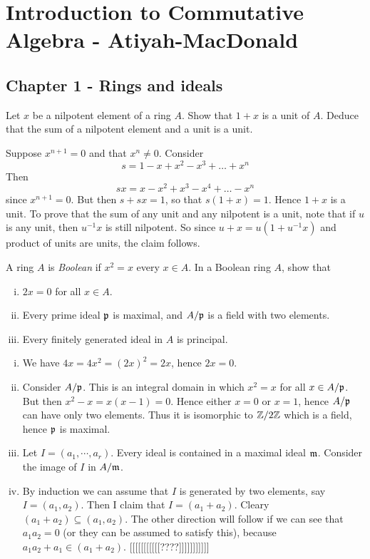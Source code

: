 \documentclass[11pt, english]{article}
\begin{document}
\section{Introduction to Commutative Algebra - Atiyah-MacDonald}

\subsection{Chapter 1 - Rings and ideals}

\begin{exc}
Let $x$ be a nilpotent element of a ring $A$. Show that $1+x$ is a unit of $A$. Deduce that the sum of a nilpotent element and a unit is a unit.
\end{exc}
\begin{sol}
Suppose $x^{n+1}=0$ and that $x^n \neq 0$. Consider
\[
s = 1-x+x^2-x^3+\ldots+x^n
\]
Then
\[
sx = x-x^2+x^3-x^4+\ldots-x^n
\]
since $x^{n+1}=0$. But then $s+sx=1$, so that $s(1+x)=1$. Hence $1+x$ is a unit. To prove that the sum of any unit and any nilpotent is a unit, note that if $u$ is any unit, then $u^{-1}x$ is still nilpotent. So since $u+x=u(1+u^{-1}x)$ and product of units are units, the claim follows.
\end{sol}

\begin{exc}[Exercise 11]
A ring $A$ is \emph{Boolean} if $x^2=x$ every $x \in A$. In a Boolean ring $A$, show that
\begin{enumerate}[i)]
\item $2x=0$ for all $x \in A$.
\item Every prime ideal $\mathfrak{p}$ is maximal, and $A/\mathfrak{p}$ is a field with two elements.
\item Every finitely generated ideal in $A$ is principal.
\end{enumerate}
\end{exc}
\begin{sol}
  \begin{enumerate}[i)]
  \item We have $4x=4x^2=(2x)^2=2x$, hence $2x=0$.
\item Consider $A/\mathfrak{p}$. This is an integral domain in which $x^2=x$ for all $x \in A/\mathfrak{p}$. But then $x^2-x=x(x-1)=0$. Hence either $x=0$ or $x=1$, hence $A/\mathfrak{p}$ can have only two elements. Thus it is isomorphic to $\mathbb{Z}/2\mathbb{Z}$ which is a field, hence $\mathfrak{p}$ is maximal.
\item Let $I=(a_1,\cdots,a_r)$. Every ideal is contained in a maximal ideal $\mathfrak{m}$. Consider the image of $I$ in $A/\mathfrak{m}$. 
\item By induction we can assume that $I$ is generated by two elements, say $I=(a_1,a_2)$. Then I claim that $I=(a_1+a_2)$. Cleary $(a_1+a_2) \subseteq (a_1,a_2)$. The other direction will follow if we can see that $a_1a_2=0$ (or they can be assumed to satisfy this), because $a_1a_2+a_1 \in (a_1+a_2)$.  [[[[[[[[[[[????]]]]]]]]]]]
\end{enumerate}
\end{sol}
\end{document}
